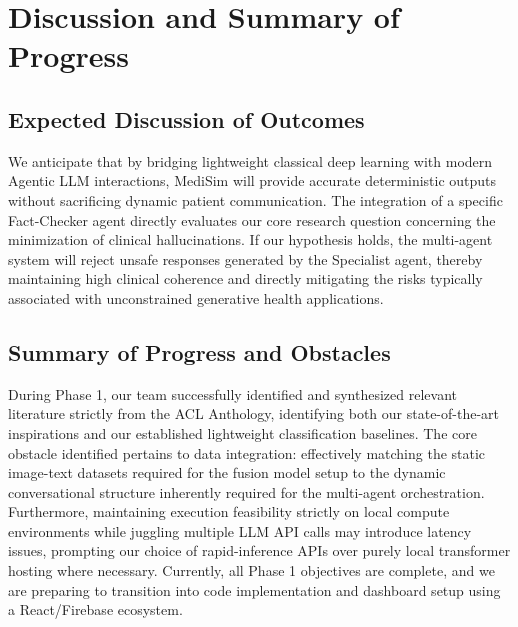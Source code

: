 \documentclass[11pt,a4paper]{article}
\begin{document}
\section{Discussion and Summary of Progress}

\subsection{Expected Discussion of Outcomes}
We anticipate that by bridging lightweight classical deep learning with modern Agentic LLM interactions, MediSim will provide accurate deterministic outputs without sacrificing dynamic patient communication. The integration of a specific Fact-Checker agent directly evaluates our core research question concerning the minimization of clinical hallucinations. If our hypothesis holds, the multi-agent system will reject unsafe responses generated by the Specialist agent, thereby maintaining high clinical coherence and directly mitigating the risks typically associated with unconstrained generative health applications. 

\subsection{Summary of Progress and Obstacles}
During Phase 1, our team successfully identified and synthesized relevant literature strictly from the ACL Anthology, identifying both our state-of-the-art inspirations and our established lightweight classification baselines. The core obstacle identified pertains to data integration: effectively matching the static image-text datasets required for the fusion model setup to the dynamic conversational structure inherently required for the multi-agent orchestration. Furthermore, maintaining execution feasibility strictly on local compute environments while juggling multiple LLM API calls may introduce latency issues, prompting our choice of rapid-inference APIs over purely local transformer hosting where necessary. Currently, all Phase 1 objectives are complete, and we are preparing to transition into code implementation and dashboard setup using a React/Firebase ecosystem.


\end{document}
